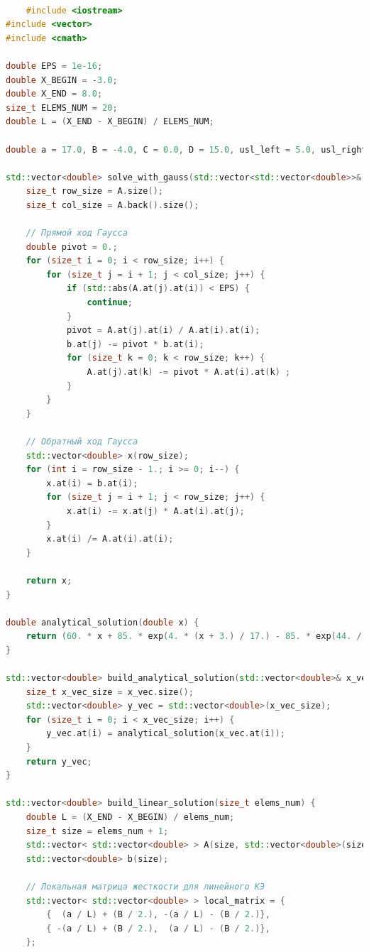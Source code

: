 \begin{lstlisting}[language=c++, label=prog,caption={\textit{Реализация МКЭ}}]

	#include <iostream>
#include <vector>
#include <cmath>

double EPS = 1e-16;
double X_BEGIN = -3.0;
double X_END = 8.0;
size_t ELEMS_NUM = 20;
double L = (X_END - X_BEGIN) / ELEMS_NUM;

double a = 17.0, B = -4.0, C = 0.0, D = 15.0, usl_left = 5.0, usl_right = 4.0; // au"+Bu'+Cu+D=0

std::vector<double> solve_with_gauss(std::vector<std::vector<double>>& A, std::vector<double>& b){
    size_t row_size = A.size();
    size_t col_size = A.back().size();

    // Прямой ход Гаусса
    double pivot = 0.;
    for (size_t i = 0; i < row_size; i++) {
        for (size_t j = i + 1; j < col_size; j++) {
            if (std::abs(A.at(j).at(i)) < EPS) {
                continue;
            }
            pivot = A.at(j).at(i) / A.at(i).at(i);
            b.at(j) -= pivot * b.at(i);
            for (size_t k = 0; k < row_size; k++) {
                A.at(j).at(k) -= pivot * A.at(i).at(k) ;
            }
        }
    }

    // Обратный ход Гаусса
    std::vector<double> x(row_size);
    for (int i = row_size - 1.; i >= 0; i--) {
        x.at(i) = b.at(i);
        for (size_t j = i + 1; j < row_size; j++) {
            x.at(i) -= x.at(j) * A.at(i).at(j);
        }
        x.at(i) /= A.at(i).at(i);
    }

    return x;
}

double analytical_solution(double x) {
    return (60. * x + 85. * exp(4. * (x + 3.) / 17.) - 85. * exp(44. / 17.) - 416.) / 16.;
}

std::vector<double> build_analytical_solution(std::vector<double>& x_vec) {
    size_t x_vec_size = x_vec.size();
    std::vector<double> y_vec = std::vector<double>(x_vec_size);
    for (size_t i = 0; i < x_vec_size; i++) {
        y_vec.at(i) = analytical_solution(x_vec.at(i));
    }
    return y_vec;
}

std::vector<double> build_linear_solution(size_t elems_num) {
    double L = (X_END - X_BEGIN) / elems_num;
    size_t size = elems_num + 1;
    std::vector< std::vector<double> > A(size, std::vector<double>(size));
    std::vector<double> b(size);

    // Локальная матрица жесткости для линейного КЭ
    std::vector< std::vector<double> > local_matrix = {
        {  (a / L) + (B / 2.), -(a / L) - (B / 2.)},
        { -(a / L) + (B / 2.),  (a / L) - (B / 2.)},
    };


\end{lstlisting}
